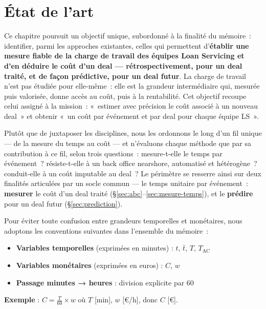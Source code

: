 \section{État de l'art}
\label{etat-de-lart}

Ce chapitre poursuit un objectif unique, subordonné à la finalité du mémoire~:
identifier, parmi les approches existantes, celles qui permettent d'\textbf{établir une
mesure fiable de la charge de travail des équipes Loan Servicing et d'en déduire le
coût d'un deal --- rétrospectivement, pour un deal traité, et de façon prédictive, pour
un deal futur}. La charge de travail n'est pas étudiée pour elle-même~: elle est la
grandeur intermédiaire qui, mesurée puis valorisée, donne accès au coût, puis à la
rentabilité. Cet objectif recoupe celui assigné à la mission~: «~estimer avec précision
le coût associé à un nouveau deal~» et obtenir «~un coût par événement et par deal pour
chaque équipe LS~».

Plutôt que de juxtaposer les disciplines, nous les ordonnons le long d'un fil unique ---
de la mesure du temps au coût --- et n'évaluons chaque méthode que par sa contribution à
ce fil, selon trois questions~: mesure-t-elle le temps par événement~? résiste-t-elle à
un back office nearshore, automatisé et hétérogène~? conduit-elle à un coût imputable au
deal~? Le périmètre se resserre ainsi sur deux finalités articulées par un socle
commun --- le temps unitaire par événement~: \textbf{mesurer} le coût d'un deal traité
(§\ref{sec:abc}--\ref{sec:mesure-temps}), et le \textbf{prédire} pour un deal futur
(§\ref{sec:prediction}).

\begin{tcolorbox}[colback=blue!5!white,colframe=blue!75!black,title=Convention de notation]
Pour éviter toute confusion entre grandeurs temporelles et monétaires, nous adoptons les conventions suivantes dans l'ensemble du mémoire~:

\begin{itemize}
    \item \textbf{Variables temporelles} (exprimées en minutes) : $t$, $\bar{t}$, $T$, $T_{\text{AC}}$
    \item \textbf{Variables monétaires} (exprimées en euros) : $C$, $w$
    \item \textbf{Passage minutes → heures} : division explicite par 60
\end{itemize}

\textbf{Exemple} : $C = \frac{T}{60} \times w$ où $T$ [min], $w$ [€/h], donc $C$ [€].
\end{tcolorbox}

